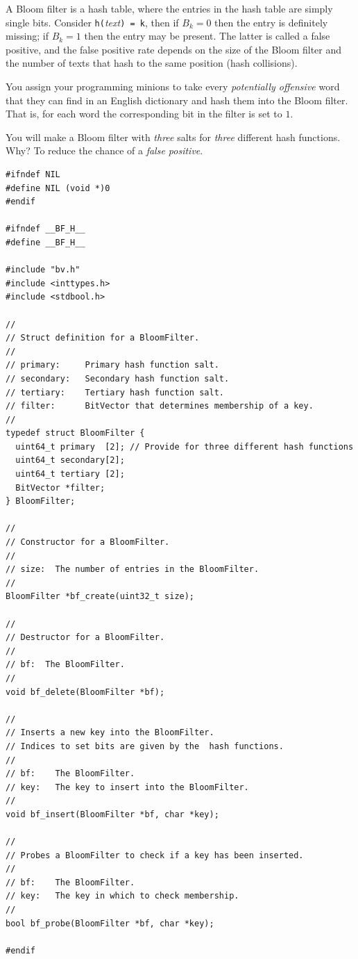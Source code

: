 \documentclass{article}
\begin{document}
A Bloom filter is a hash table, where the entries in the hash table are simply
single bits.  Consider \texttt{h(}\emph{text}\texttt{) = k}, then if $B_k = 0$
then the entry is definitely missing; if $B_k = 1$ then the entry may be
present.  The latter is called a false positive, and the false positive rate
depends on the size of the Bloom filter and the number of texts that hash to the
same position (hash collisions).

You assign your programming minions to take every \emph{potentially offensive}
word that they can find in an English dictionary and hash them into the Bloom
filter. That is, for each word the corresponding bit in the filter is set to
$1$.

You will make a Bloom filter with \emph{three} salts for \emph{three} different
hash functions. Why? To reduce the chance of a \emph{false positive}.

\lstset{language=C, style=c99}
\begin{lstlisting}[title=bf.h]
#ifndef NIL
#define NIL (void *)0
#endif

#ifndef __BF_H__
#define __BF_H__

#include "bv.h"
#include <inttypes.h>
#include <stdbool.h>

//
// Struct definition for a BloomFilter.
//
// primary:     Primary hash function salt.
// secondary:   Secondary hash function salt.
// tertiary:    Tertiary hash function salt.
// filter:      BitVector that determines membership of a key.
//
typedef struct BloomFilter {
  uint64_t primary  [2]; // Provide for three different hash functions
  uint64_t secondary[2];
  uint64_t tertiary [2];
  BitVector *filter;
} BloomFilter;

//
// Constructor for a BloomFilter.
//
// size:  The number of entries in the BloomFilter.
//
BloomFilter *bf_create(uint32_t size);

//
// Destructor for a BloomFilter.
//
// bf:  The BloomFilter.
//
void bf_delete(BloomFilter *bf);

//
// Inserts a new key into the BloomFilter.
// Indices to set bits are given by the  hash functions.
//
// bf:    The BloomFilter.
// key:   The key to insert into the BloomFilter.
//
void bf_insert(BloomFilter *bf, char *key);

//
// Probes a BloomFilter to check if a key has been inserted.
//
// bf:    The BloomFilter.
// key:   The key in which to check membership.
//
bool bf_probe(BloomFilter *bf, char *key);

#endif
\end{lstlisting}
\end{document}
